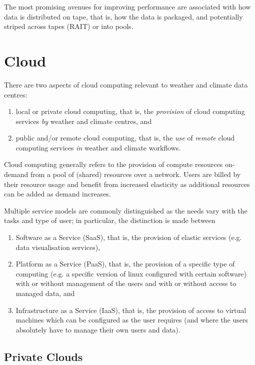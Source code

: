 \documentclass{../../template/esiwace-report}
\begin{document}
The most promising avenues for improving performance are associated with how data is distributed on tape, that is, how the data is packaged, and potentially striped across tapes (RAIT) or into pools.


\section{Cloud}
\label{sec:cloud}

There are two aspects of cloud computing relevant to weather and climate data centres:
\begin{enumerate}
\item local or private cloud computing, that is, the  \textit{provision} of cloud computing services \textit{by} weather and climate centres, and
\item public and/or remote cloud computing, that is, the \textit{use} of \textit{remote} cloud computing services \textit{in} weather and climate workflows.
\end{enumerate}

Cloud computing \cite{mell_800-145:_2011} generally refers to the provision of compute resources on-demand from a pool of (shared) resources over a network.
Users are billed by their resource usage and benefit from increased elasticity as additional resources can be added as demand increases.

Multiple service models are commonly distinguished as the needs vary with the tasks and type of user; in particular, the
distinction is made between \begin{enumerate}
\item Software as a Service (SaaS), that is,  the provision of elastic services (e.g. data visualisation services),
\item Platform as a Service (PaaS), that is, the provision of a specific type of computing (e.g. a specific version of linux configured with certain software) with or without management of the users and with or without access to managed data, and
\item Infrastructure as a Service (IaaS), that is, the provision of access to virtual machines which can be configured as the user requires (and where the users absolutely have to manage their own users and data).
\end{enumerate}

\subsection{Private Clouds}
\end{document}
